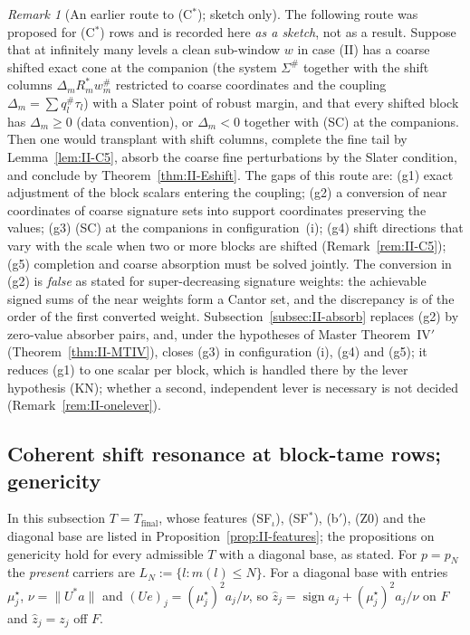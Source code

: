 \documentclass[10pt]{amsart}
\theoremstyle{definition}
\theoremstyle{remark}
\newtheorem{remark}[theorem]{Remark}
\newcommand{\sgn}{\operatorname{sign}}
\newcommand{\zh}{\hat z}
\begin{document}
\begin{remark}[An earlier route to (C$^*$); sketch only]\label{rem:II-C6}
The following route was proposed for (C$^*$) rows and is recorded here
\emph{as a sketch}, not as a result.  Suppose that at infinitely many levels
a clean sub-window $w$ in case (II) has a coarse shifted exact cone at the
companion (the system $\Sigma^\#$ together with the shift columns $\Delta_m
R_m^*w^\#_m$ restricted to coarse coordinates and the coupling $\Delta_m=\sum
q^\#_l\tau_l$) with a Slater point of robust margin, and that every shifted
block has $\Delta_m\ge0$ (data convention), or $\Delta_m<0$ together with
(SC) at the companions.  Then one would transplant with shift columns,
complete the fine tail by Lemma~\ref{lem:II-C5}, absorb the coarse fine
perturbations by the Slater condition, and conclude by
Theorem~\ref{thm:II-Eshift}.  The gaps of this route are: (g1) exact
adjustment of the block scalars entering the coupling; (g2) a conversion
of near coordinates of coarse signature sets into support coordinates
preserving the values; (g3) (SC) at the companions in configuration~(i);
(g4) shift directions that vary with the scale when two or more blocks are
shifted (Remark~\ref{rem:II-C5}); (g5) completion and coarse absorption must
be solved jointly.  The conversion in (g2) is \emph{false} as stated for
super-decreasing signature weights: the achievable signed sums of the near
weights form a Cantor set, and the discrepancy is of the order of the first
converted weight.  Subsection~\ref{subsec:II-absorb} replaces (g2) by
zero-value absorber pairs, and, under the hypotheses of Master
Theorem~IV$'$ (Theorem~\ref{thm:II-MTIV}), closes (g3) in configuration (i),
(g4) and (g5); it reduces (g1) to one scalar per block, which is handled
there by the lever hypothesis (KN); whether a second, independent lever is
necessary is not decided (Remark~\ref{rem:II-onelever}).
\end{remark}

\subsection{Coherent shift resonance at block-tame rows; genericity}\label{subsec:II-SA}

In this subsection $T=T_{\mathrm{final}}$, whose features (SF$_\iota$),
(SF$^*$), (b$'$), (Z0) and the diagonal base are listed in
Proposition~\ref{prop:II-features}; the propositions on genericity hold for
every admissible $T$ with a diagonal base, as stated.  For $p=p_N$ the
\emph{present} carriers are $L_N:=\{l:m(l)\le N\}$.  For a diagonal base
with entries $\mu^\star_j$, $\nu=\|U^*a\|$ and $(Ue)_j=(\mu^\star_j)^2a_j/\nu$,
so $\zh_j=\sgn a_j+(\mu^\star_j)^2a_j/\nu$ on $F$ and $\zh_j=z_j$ off $F$.
\end{document}
